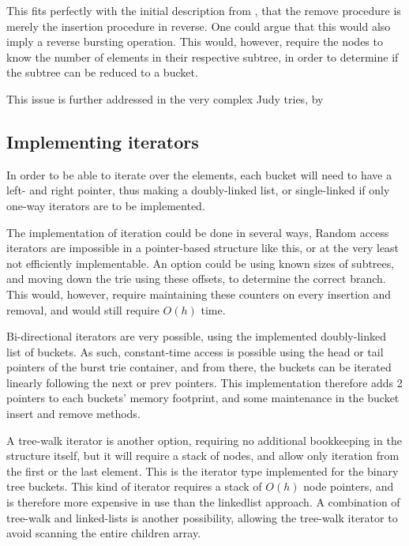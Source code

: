 This fits perfectly with the initial description from \cite{Nash:2008}, that
the remove procedure is merely the insertion procedure in reverse. One could argue
that this would also imply a reverse bursting operation. This would, however,
require the nodes to know the number of elements in their respective subtree,
in order to determine if the subtree can be reduced to a bucket.

This issue is further addressed in the very complex Judy tries, by

\subsection{Implementing iterators}
In order to be able to iterate over the elements, each bucket will need
to have a {\keyword left}- and {\keyword right} pointer, thus making a
doubly-linked list, or single-linked if only one-way iterators are to
be implemented.


The implementation of iteration could be done in several ways, 
Random access iterators are impossible in a pointer-based structure like this,
or at the very least not efficiently implementable. An option could be using known
sizes of subtrees, and moving down the trie using these offsets, to determine the
correct branch. This would, however, require maintaining these counters on every
insertion and removal, and would still require $O(h)$ time.

Bi-directional iterators are very possible, using the implemented doubly-linked
list of buckets. As such, constant-time access is possible using the head or tail
pointers of the burst trie container, and from there, the buckets can be iterated
linearly following the {\keyword next} or {\keyword prev} pointers. This implementation
therefore adds 2 pointers to each buckets' memory footprint, and some maintenance in the
bucket insert and remove methods.

A tree-walk iterator is another option, requiring no additional bookkeeping in the structure
itself, but it will require a stack of nodes, and allow only iteration from the first or the last element.
This is the iterator type implemented for the binary tree buckets. This kind of iterator requires
a stack of $O(h)$ node pointers, and is therefore more expensive in use than the linkedlist approach.
A combination of tree-walk and linked-lists is another possibility, allowing the tree-walk iterator
to avoid scanning the entire children array.

